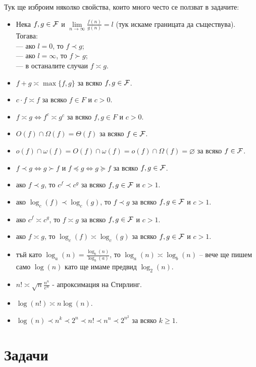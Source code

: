 Тук ще изброим няколко свойства, които много често се ползват в задачите:
\begin{itemize}
  \item Нека $f, g \in \mathcal{F}$ и $\lim\limits_{n \rightarrow \infty} \frac{f(n)}{g(n)} = l$ (тук искаме границата да съществува).
        Тогава: \\
        --- ако $l = 0$, то $f \prec g$; \\
        --- ако $l = \infty$, то $f \succ g$; \\
        --- в останалите случаи $f \asymp g$.
  \item $f + g \asymp \max\{f, g\}$ за всяко $f, g \in \mathcal{F}$.
  \item $c \cdot f \asymp f$ за всяко $f \in F$ и $c > 0$.
  \item $f \asymp g \iff f^c \asymp g^c$ за всяко $f, g \in F$ и $c > 0$.
  \item $O(f) \cap \Omega(f) = \Theta(f)$ за всяко $f \in \mathcal{F}$.
  \item $o(f) \cap \omega(f) = O(f) \cap \omega(f) = o(f) \cap \Omega(f) = \varnothing$ за всяко $f \in \mathcal{F}$.
  \item $f \prec g \iff g \succ f$ и $f \preceq g \iff g \succeq f$ за всяко $f, g \in \mathcal{F}$.
  \item ако $f \prec g$, то $c^f \prec c^g$ за всяко $f, g \in \mathcal{F}$ и $c > 1$.
  \item ако $\log_c(f) \prec \log_c(g)$, то $f \prec g$ за всяко $f, g \in \mathcal{F}$ и $c > 1$.
  \item ако $c^f \asymp c^g$, то $f \asymp g$ за всяко $f, g \in \mathcal{F}$ и $c > 1$.
  \item ако $f \asymp g$, то $\log_c(f) \asymp \log_c(g)$ за всяко $f, g \in \mathcal{F}$ и $c > 1$.
  \item тъй като $\log_a(n) = \frac{\log_b(n)}{\log_b(a)}$, то $\log_a(n) \asymp \log_b(n)$ -- вече ще пишем само $\log(n)$ като ще имаме предвид $\log_2(n)$.
  \item $n! \asymp \sqrt{n} \frac{n^n}{e^n}$ - апроксимация на Стирлинг.
  \item $\log(n!) \asymp n \log(n)$.
  \item $\log(n) \prec n^k \prec 2^n \prec n! \prec n^n \prec 2^{n^2}$ за всяко $k \geq 1$.
\end{itemize}

\section{Задачи}


